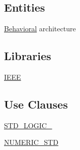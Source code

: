 \subsection*{Entities}
\begin{DoxyCompactItemize}
\item 
\hyperlink{classtb___linear_regression_1_1_behavioral}{Behavioral} architecture
\end{DoxyCompactItemize}
\subsection*{Libraries}
 \begin{DoxyCompactItemize}
\item 
\hyperlink{classtb___linear_regression_ae4f03c286607f3181e16b9aa12d0c6d4}{I\+E\+E\+E} 
\end{DoxyCompactItemize}
\subsection*{Use Clauses}
 \begin{DoxyCompactItemize}
\item 
\hyperlink{classtb___linear_regression_aa4b2b25246a821511120e3149b003563}{S\+T\+D\+\_\+\+L\+O\+G\+I\+C\+\_}   
\item 
\hyperlink{classtb___linear_regression_ae00f3f04545af57582ff10609eee23e2}{N\+U\+M\+E\+R\+I\+C\+\_\+\+S\+T\+D}   
\end{DoxyCompactItemize}


